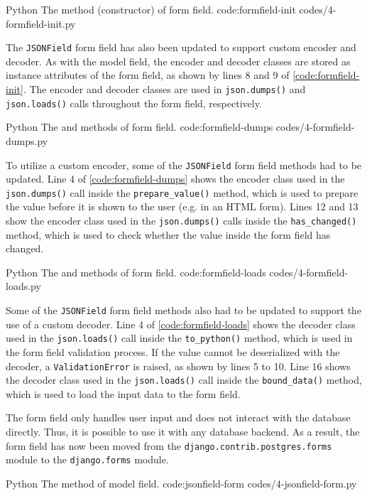 \listing
{Python}
{The  method (constructor) of  form field.}
{code:formfield-init}
{codes/4-formfield-init.py}

The \verb|JSONField| form field has also been updated to support custom encoder
and decoder. As with the model field, the encoder and decoder classes are
stored as instance attributes of the form field, as shown by lines 8 and 9 of
\autoref{code:formfield-init}. The encoder and decoder classes are used in
\verb|json.dumps()| and \verb|json.loads()| calls throughout the form field,
respectively.

\listing
{Python}
{The  and  methods of
 form field.}
{code:formfield-dumps}
{codes/4-formfield-dumps.py}

To utilize a custom encoder, some of the \verb|JSONField| form field methods
had to be updated. Line 4 of \autoref{code:formfield-dumps} shows the encoder
class used in the \verb|json.dumps()| call inside the \verb|prepare_value()|
method, which is used to prepare the value before it is shown to the user (e.g.
in an HTML form). Lines 12 and 13 show the encoder class used in the
\verb|json.dumps()| calls inside the \verb|has_changed()| method, which is used
to check whether the value inside the form field has changed.

\listing
{Python}
{The  and  methods of 
form field.}
{code:formfield-loads}
{codes/4-formfield-loads.py}

Some of the \verb|JSONField| form field methods also had to be updated to
support the use of a custom decoder. Line 4 of \autoref{code:formfield-loads}
shows the decoder class used in the \verb|json.loads()| call inside the
\verb|to_python()| method, which is used in the form field validation process.
If the value cannot be deserialized with the decoder, a \verb|ValidationError|
is raised, as shown by lines 5 to 10. Line 16 shows the decoder class used in
the \verb|json.loads()| call inside the \verb|bound_data()| method, which is
used to load the input data to the form field.

The form field only handles user input and does not interact with the database
directly. Thus, it is possible to use it with any database backend. As a
result, the form field has now been moved from the
\verb|django.contrib.postgres.forms| module to the \verb|django.forms| module.

\listing
{Python}
{The  method of  model field.}
{code:jsonfield-form}
{codes/4-jsonfield-form.py}

